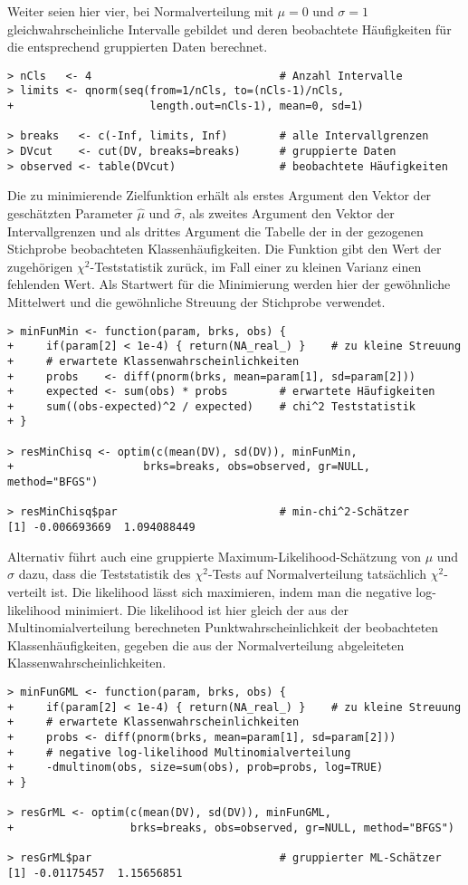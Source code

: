 Weiter seien hier vier, bei Normalverteilung mit $\mu = 0$ und $\sigma = 1$ gleichwahrscheinliche Intervalle gebildet und deren beobachtete Häufigkeiten für die entsprechend gruppierten Daten berechnet.
\begin{lstlisting}
> nCls   <- 4                             # Anzahl Intervalle
> limits <- qnorm(seq(from=1/nCls, to=(nCls-1)/nCls,
+                     length.out=nCls-1), mean=0, sd=1)

> breaks   <- c(-Inf, limits, Inf)        # alle Intervallgrenzen
> DVcut    <- cut(DV, breaks=breaks)      # gruppierte Daten
> observed <- table(DVcut)                # beobachtete Häufigkeiten
\end{lstlisting}

Die zu minimierende Zielfunktion erhält als erstes Argument den Vektor der geschätzten Parameter $\hat{\mu}$ und $\hat{\sigma}$, als zweites Argument den Vektor der Intervallgrenzen und als drittes Argument die Tabelle der in der gezogenen Stichprobe beobachteten Klassenhäufigkeiten. Die Funktion gibt den Wert der zugehörigen $\chi^{2}$-Teststatistik zurück, im Fall einer zu kleinen Varianz einen fehlenden Wert. Als Startwert für die Minimierung werden hier der gewöhnliche Mittelwert und die gewöhnliche Streuung der Stichprobe verwendet.
\begin{lstlisting}
> minFunMin <- function(param, brks, obs) {
+     if(param[2] < 1e-4) { return(NA_real_) }    # zu kleine Streuung
+     # erwartete Klassenwahrscheinlichkeiten
+     probs    <- diff(pnorm(brks, mean=param[1], sd=param[2]))
+     expected <- sum(obs) * probs        # erwartete Häufigkeiten
+     sum((obs-expected)^2 / expected)    # chi^2 Teststatistik
+ }

> resMinChisq <- optim(c(mean(DV), sd(DV)), minFunMin,
+                    brks=breaks, obs=observed, gr=NULL, method="BFGS")

> resMinChisq$par                         # min-chi^2-Schätzer
[1] -0.006693669  1.094088449
\end{lstlisting}

Alternativ führt auch eine gruppierte Maximum-Likelihood-Schätzung von $\mu$ und $\sigma$ dazu, dass die Teststatistik des $\chi^{2}$-Tests auf Normalverteilung tatsächlich $\chi^{2}$-verteilt ist. Die likelihood lässt sich maximieren, indem man die negative log-likelihood minimiert. Die likelihood ist hier gleich der aus der Multinomialverteilung berechneten Punktwahrscheinlichkeit der beobachteten Klassenhäufigkeiten, gegeben die aus der Normalverteilung abgeleiteten Klassenwahrscheinlichkeiten.
\begin{lstlisting}
> minFunGML <- function(param, brks, obs) {
+     if(param[2] < 1e-4) { return(NA_real_) }    # zu kleine Streuung
+     # erwartete Klassenwahrscheinlichkeiten
+     probs <- diff(pnorm(brks, mean=param[1], sd=param[2]))
+     # negative log-likelihood Multinomialverteilung
+     -dmultinom(obs, size=sum(obs), prob=probs, log=TRUE)
+ }

> resGrML <- optim(c(mean(DV), sd(DV)), minFunGML,
+                  brks=breaks, obs=observed, gr=NULL, method="BFGS")

> resGrML$par                             # gruppierter ML-Schätzer
[1] -0.01175457  1.15656851
\end{lstlisting}

